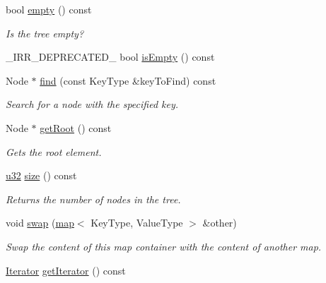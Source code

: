 \begin{DoxyCompactItemize}
bool \hyperlink{classirr_1_1core_1_1map_a253070a62165cc9881cc75bc774f7034}{empty} () const
\begin{DoxyCompactList}\small\item\em Is the tree empty? \end{DoxyCompactList}\item 
\+\_\+\+I\+R\+R\+\_\+\+D\+E\+P\+R\+E\+C\+A\+T\+E\+D\+\_\+ bool \hyperlink{classirr_1_1core_1_1map_a2a5b309f8737e2aca9668e32c71f05ed}{is\+Empty} () const
\item 
Node $\ast$ \hyperlink{classirr_1_1core_1_1map_ad6a62579dceda1da7605ee78bca3e318}{find} (const Key\+Type \&key\+To\+Find) const
\begin{DoxyCompactList}\small\item\em Search for a node with the specified key. \end{DoxyCompactList}\item 
Node $\ast$ \hyperlink{classirr_1_1core_1_1map_a6666acf9724e2e20cd338a6a5ff66c65}{get\+Root} () const
\begin{DoxyCompactList}\small\item\em Gets the root element. \end{DoxyCompactList}\item 
\mbox{\label{classirr_1_1core_1_1map_aa4d56d82c7fe2a72327f91f2f6c92465}} 
\hyperlink{namespaceirr_a0416a53257075833e7002efd0a18e804}{u32} \hyperlink{classirr_1_1core_1_1map_aa4d56d82c7fe2a72327f91f2f6c92465}{size} () const
\begin{DoxyCompactList}\small\item\em Returns the number of nodes in the tree. \end{DoxyCompactList}\item 
void \hyperlink{classirr_1_1core_1_1map_a411cde5df191c16616e20eb7027b9a20}{swap} (\hyperlink{classirr_1_1core_1_1map}{map}$<$ Key\+Type, Value\+Type $>$ \&other)
\begin{DoxyCompactList}\small\item\em Swap the content of this map container with the content of another map. \end{DoxyCompactList}\item 
\mbox{\label{classirr_1_1core_1_1map_ac5c4970e278272eaf28f010d8b82a4dc}} 
\hyperlink{classirr_1_1core_1_1map_1_1Iterator}{Iterator} \hyperlink{classirr_1_1core_1_1map_ac5c4970e278272eaf28f010d8b82a4dc}{get\+Iterator} () const

\end{DoxyCompactItemize}
